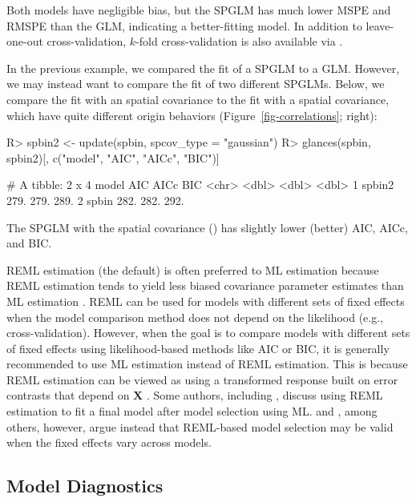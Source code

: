 \documentclass[
]{jss}
\begin{document}
Both models have negligible bias, but the SPGLM has much lower MSPE and
RMSPE than the GLM, indicating a better-fitting model. In addition to
leave-one-out cross-validation, \(k\)-fold cross-validation is also
available via .

In the previous example, we compared the fit of a SPGLM to a GLM.
However, we may instead want to compare the fit of two different SPGLMs.
Below, we compare the fit with an  spatial
covariance to the fit with a  spatial covariance, which
have quite different origin behaviors (Figure~\ref{fig-correlations};
right):

\begin{CodeChunk}
\begin{CodeInput}
R> spbin2 <- update(spbin, spcov_type = "gaussian")
R> glances(spbin, spbin2)[, c("model", "AIC", "AICc", "BIC")]
\end{CodeInput}
\begin{CodeOutput}
# A tibble: 2 x 4
  model    AIC  AICc   BIC
  <chr>  <dbl> <dbl> <dbl>
1 spbin2  279.  279.  289.
2 spbin   282.  282.  292.
\end{CodeOutput}
\end{CodeChunk}

The SPGLM with the  spatial covariance ()
has slightly lower (better) AIC, AICc, and BIC.

REML estimation (the  default) is often preferred to ML
estimation because REML estimation tends to yield less biased covariance
parameter estimates than ML estimation \citep{cressie1993asymptotic}.
REML can be used for models with different sets of fixed effects when
the model comparison method does not depend on the likelihood (e.g.,
cross-validation). However, when the goal is to compare models with
different sets of fixed effects using likelihood-based methods like AIC
or BIC, it is generally recommended to use ML estimation instead of REML
estimation. This is because REML estimation can be viewed as using a
transformed response built on error contrasts that depend on
\(\mathbf{X}\) \citep{wolfinger1993covariance, bates2015lme4}. Some
authors, including \citet{zuur2009mixed}, discuss using REML estimation
to fit a final model after model selection using ML.
\citet{gurka2006selecting} and \citet{kubokawa2011conditional}, among
others, however, argue instead that REML-based model selection may be
valid when the fixed effects vary across models.

\subsection{Model Diagnostics}\label{model-diagnostics}
\end{document}
